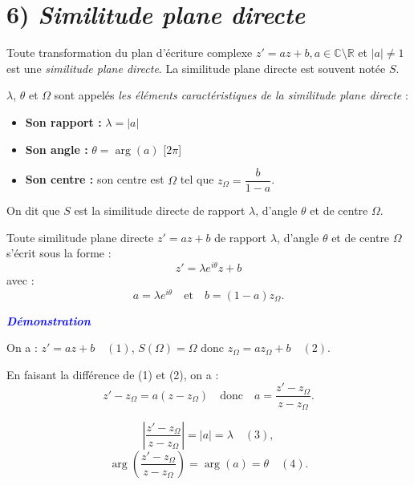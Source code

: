 \documentclass{article}
\begin{document}
\section*{6) \textit{Similitude plane directe}}

Toute transformation du plan d’écriture complexe \( z' = a z + b,  a \in \mathbb{C} \setminus \mathbb{R} \) et \( |a| \neq 1 \) est une \textit{similitude plane directe}. La similitude plane directe est souvent notée \( S \).

\( \lambda \), \( \theta \) et \( \Omega \) sont appelés \textit{les éléments caractéristiques de la similitude plane directe} :

\begin{itemize}
    \item \textbf{Son rapport :} \( \lambda = |a| \)
    \item \textbf{Son angle :} \( \theta = \arg(a) \) [\(2\pi\)]
    \item \textbf{Son centre :} son centre est \( \Omega \) tel que \( z_{\Omega} = \dfrac{b}{1 - a} \).
\end{itemize}

On dit que \( S \) est la similitude directe de rapport \( \lambda \), d’angle \( \theta \) et de centre \( \Omega \).

\vspace{0.3cm}

Toute similitude plane directe \( z' = a z + b \) de rapport \( \lambda \), d’angle \( \theta \) et de centre \( \Omega \) s'écrit sous la forme :
\[
z' = \lambda e^{i\theta} z + b
\]
avec :
\[
a = \lambda e^{i\theta} \quad \text{et} \quad b = (1 - a) z_{\Omega}.
\]

\textbf{\textcolor{blue}{\textit{Démonstration}}}

\vspace{0.3cm}

On a : \( z' = a z + b \quad (1) \), \quad \( S(\Omega) = \Omega \) \quad donc \( z_{\Omega} = a z_{\Omega} + b \quad (2) \).

\vspace{0.3cm}

En faisant la différence de (1) et (2), on a : 
\[
z' - z_{\Omega} = a( z - z_{\Omega}) \quad \text{donc} \quad a = \frac{z' - z_{\Omega}}{z - z_{\Omega}}.
\]

\[
\left| \frac{z' - z_{\Omega}}{z - z_{\Omega}} \right| = |a| = \lambda \quad (3),
\]
\[
\arg \left( \frac{z' - z_{\Omega}}{z - z_{\Omega}} \right) = \arg(a) = \theta \quad (4).
\]
\end{document}

